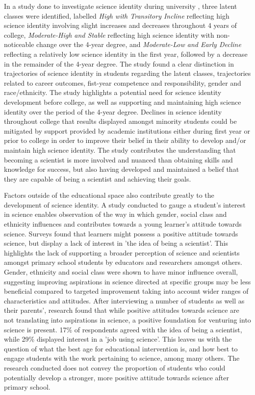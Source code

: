 \documentclass[conference]{IEEEtran}
\begin{document}
In a study done to investigate science identity during university \cite{b8}, three latent classes were identified, labelled \textit{High with Transitory Incline} reflecting high science identity involving slight increases and decreases throughout 4 years of college, \textit{Moderate-High and Stable} reflecting high science identity with non-noticeable change over the 4-year degree, and \textit{Moderate-Low and Early Decline} reflecting a relatively low science identity in the first year, followed by a decrease in the remainder of the 4-year degree. The study found a clear distinction in trajectories of science identity in students regarding the latent classes, trajectories related to career outcomes, fist-year competence and responsibility, gender and race/ethnicity. The study highlights a potential need for science identity development before college, as well as supporting and maintaining high science identity over the period of the 4-year degree. Declines in science identity throughout college that results displayed amongst minority students could be mitigated by support provided by academic institutions either during first year or prior to college in order to improve their belief in their ability to develop and/or maintain high science identity. The study contributes the understanding that becoming a scientist is more involved and nuanced than obtaining skills and knowledge for success, but also having developed and maintained a belief that they are capable of being a scientist and achieving their goals.

Factors outside of the educational space also contribute greatly to the development of science identity. A study conducted to gauge a student’s interest in science \cite{b9} enables observation of the way in which gender, social class and ethnicity influences and contributes towards a young learner's attitude towards science. Surveys found that learners might possess a positive attitude towards science, but display a lack of interest in 'the idea of being a scientist'. This highlights the lack of supporting a broader perception of science and scientists amongst primary school students by educators and researchers amongst others. Gender, ethnicity and social class were shown to have minor influence overall, suggesting improving aspirations in science directed at specific groups may be less beneficial compared to targeted improvement taking into account wider ranges of characteristics and attitudes. After interviewing a number of students as well as their parents', research found that while positive attitudes towards science are not translating into aspirations in science, a positive foundation for venturing into science is present. 17\% of respondents agreed with the idea of being a scientist, while 29\% displayed interest in a 'job using science'. This leaves us with the question of what the best age for educational intervention is, and how best to engage students with the work pertaining to science, among many others. The research conducted does not convey the proportion of students who could potentially develop a stronger, more positive attitude towards science after primary school.
\end{document}
